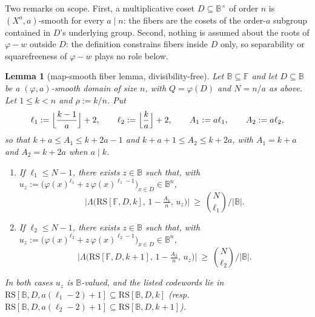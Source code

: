 \documentclass[11pt]{article}
\newtheorem{lemma}[lemma]{Lemma}
\theoremstyle{definition}
\theoremstyle{remark}
\newcommand{\F}{\mathbb{F}}
\newcommand{\B}{\mathbb{B}}
\newcommand{\RS}{\mathrm{RS}}
\newcommand{\Lst}{\Lambda}
\begin{document}
Two remarks on scope. First, a multiplicative coset $D\subseteq\B^\times$ of order $n$ is $(X^a,a)$-smooth for every $a\mid n$: the fibers are the cosets of the order-$a$ subgroup contained in $D$'s underlying group. Second, nothing is assumed about the roots of $\varphi-w$ outside $D$: the definition constrains fibers inside $D$ only, so separability or squarefreeness of $\varphi-w$ plays no role below.

\begin{lemma}[map-smooth fiber lemma, divisibility-free]\label{lem:phi-fiber}
Let $\B\subseteq\F$ and let $D\subseteq\B$ be a $(\varphi,a)$-smooth domain of size $n$, with $Q=\varphi(D)$ and $N=n/a$ as above. Let $1\le k<n$ and $\rho:=k/n$. Put
\[
\ell_1:=\Bigl\lfloor\frac{k-1}a\Bigr\rfloor+2,\qquad
\ell_2:=\Bigl\lfloor\frac{k}a\Bigr\rfloor+2,\qquad
A_1:=a\ell_1,\qquad A_2:=a\ell_2,
\]
so that $k+a\le A_1\le k+2a-1$ and $k+a+1\le A_2\le k+2a$, with $A_1=k+a$ and $A_2=k+2a$ when $a\mid k$.
\begin{enumerate}[label=\textup{(\roman*)}]
\item If $\ell_1\le N-1$, there exists $z\in\B$ such that, with $u_z:=\bigl(\varphi(x)^{\ell_1}+z\,\varphi(x)^{\ell_1-1}\bigr)_{x\in D}\in\B^n$,
\[
\bigl|\Lst\bigl(\RS[\F,D,k],\,1-\tfrac{A_1}n,\,u_z\bigr)\bigr|\ \ge\ \binom N{\ell_1}\Big/|\B| .
\]
\item If $\ell_2\le N-1$, there exists $z\in\B$ such that, with $u_z:=\bigl(\varphi(x)^{\ell_2}+z\,\varphi(x)^{\ell_2-1}\bigr)_{x\in D}\in\B^n$,
\[
\bigl|\Lst\bigl(\RS[\F,D,k+1],\,1-\tfrac{A_2}n,\,u_z\bigr)\bigr|\ \ge\ \binom N{\ell_2}\Big/|\B| .
\]
\end{enumerate}
In both cases $u_z$ is $\B$-valued, and the listed codewords lie in $\RS[\B,D,a(\ell_1-2)+1]\subseteq\RS[\B,D,k]$ \textup(resp.\ $\RS[\B,D,a(\ell_2-2)+1]\subseteq\RS[\B,D,k+1]$\textup).
\end{lemma}
\end{document}

